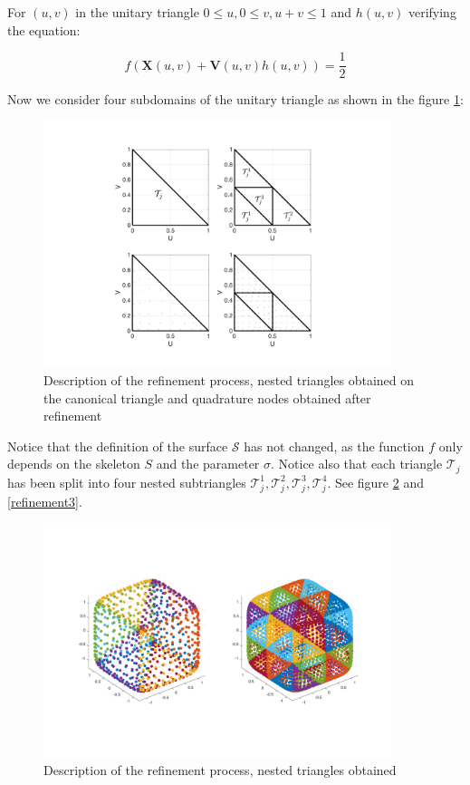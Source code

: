 \documentclass[11pt]{article}
\numberwithin{equation}{section}
\newcommand\bX{\boldsymbol X}
\newcommand\bV{\boldsymbol V}
\begin{document}
For $(u,v)$ in the unitary triangle $0\le u, 0\le v, u+v\le1$ and $h(u,v)$ verifying the equation:

\begin{equation}
f(\bX(u,v)+\bV(u,v)h(u,v))=\frac{1}{2}
\end{equation}

Now we consider four subdomains of the unitary triangle as shown in the figure \ref{refinement1}:

\begin{figure}[H]
\begin{center}
\includegraphics[width=4in]{Triangle_Refine_v2.pdf}
\end{center}
\caption{Description of the refinement process, nested triangles obtained on the canonical triangle and quadrature nodes obtained after refinement}
\label{refinement1}
\end{figure}

Notice that the definition of the surface $\mathcal{S}$ has not changed, as the function $f$ only depends on the skeleton $\mathit{S}$ and the parameter $\sigma$. Notice also that each triangle $\mathcal{T}_j$ has been split into four nested subtriangles $\mathcal{T}_j^1,\mathcal{T}_j^2,\mathcal{T}_j^3,\mathcal{T}_j^4$. See figure \ref{refinement2} and \ref{refinement3}.

\begin{figure}[H]
\begin{center}
\includegraphics[width=4in]{cloud_points_refinement_v2.pdf}%
\end{center}
\caption{Description of the refinement process, nested triangles obtained}
\label{refinement2}
\end{figure}
\end{document}

